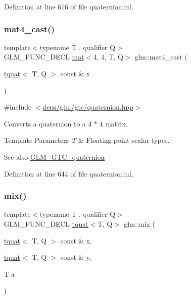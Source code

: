 Definition at line 616 of file quaternion.\+inl.

\mbox{\label{group__gtc__quaternion_ga8e2085f17cd5aae423c04536524f11b3}} 
\subsubsection{\texorpdfstring{mat4\+\_\+cast()}{mat4\_cast()}}
{\footnotesize\ttfamily template$<$typename T , qualifier Q$>$ \\
G\+L\+M\+\_\+\+F\+U\+N\+C\+\_\+\+D\+E\+CL \hyperlink{structglm_1_1mat}{mat}$<$4, 4, T, Q$>$ glm\+::mat4\+\_\+cast (\begin{DoxyParamCaption}\item[{\hyperlink{structglm_1_1tquat}{tquat}$<$ T, Q $>$ const \&}]{x }\end{DoxyParamCaption})}



{\ttfamily \#include $<$\hyperlink{gtc_2quaternion_8hpp}{deps/glm/gtc/quaternion.\+hpp}$>$}

Converts a quaternion to a 4 $\ast$ 4 matrix.


\begin{DoxyTemplParams}{Template Parameters}
{\em T} & Floating-\/point scalar types.\\
\hline
\end{DoxyTemplParams}
\begin{DoxySeeAlso}{See also}
\hyperlink{group__gtc__quaternion}{G\+L\+M\+\_\+\+G\+T\+C\+\_\+quaternion} 
\end{DoxySeeAlso}


Definition at line 644 of file quaternion.\+inl.

\mbox{\label{group__gtc__quaternion_ga6c31ccbb8548b2b24226901e602dfc0a}} 
\subsubsection{\texorpdfstring{mix()}{mix()}}
{\footnotesize\ttfamily template$<$typename T , qualifier Q$>$ \\
G\+L\+M\+\_\+\+F\+U\+N\+C\+\_\+\+D\+E\+CL \hyperlink{structglm_1_1tquat}{tquat}$<$T, Q$>$ glm\+::mix (\begin{DoxyParamCaption}\item[{\hyperlink{structglm_1_1tquat}{tquat}$<$ T, Q $>$ const \&}]{x,  }\item[{\hyperlink{structglm_1_1tquat}{tquat}$<$ T, Q $>$ const \&}]{y,  }\item[{T}]{a }\end{DoxyParamCaption})}



